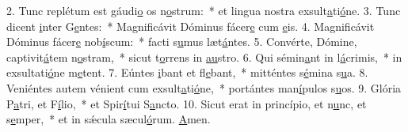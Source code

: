 2. Tunc replétum est gáudi\uline{o} os n\uline{o}strum:~* et lingua nostra exsult\uline{a}ti\uline{ó}ne.
3. Tunc dicent \uline{i}nter G\uline{e}ntes:~* Magnificávit Dóminus fácer\uline{e} cum \uline{e}is.
4. Magnificávit Dóminus fácer\uline{e} nob\uline{í}scum:~* facti s\uline{u}mus læt\uline{á}ntes.
5. Convérte, Dómine, captivit\uline{á}tem n\uline{o}stram,~* sicut t\uline{o}rrens in \uline{au}stro.
6. Qui sémin\uline{a}nt in l\uline{á}crimis,~* in exsultati\uline{ó}ne m\uline{e}tent.
7. Eúntes \uline{i}bant et fl\uline{e}bant,~* mitténtes s\uline{é}mina s\uline{u}a.
8. Veniéntes autem vénient cum exsult\uline{a}ti\uline{ó}ne,~* portántes man\uline{í}pulos s\uline{u}os.
9. Glória P\uline{a}tri, et F\uline{í}lio,~* et Spir\uline{í}tui S\uline{a}ncto.
10. Sicut erat in princípio, et n\uline{u}nc, et s\uline{e}mper,~* et in sǽcula sæcul\uline{ó}rum. \uline{A}men.
